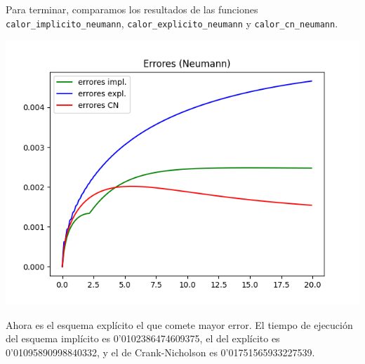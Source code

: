 \documentclass[a4paper, 12pt, oneside]{report}
\begin{document}
Para terminar, comparamos los resultados de las funciones \texttt{calor\_implicito\_neumann}, \texttt{calor\_explicito\_neumann} y \texttt{calor\_cn\_neumann}.
\begin{center}
    \includegraphics[scale = 0.8]{./images/Figure_4.png}
\end{center}
Ahora es el esquema explícito el que comete mayor error. El tiempo de ejecución del esquema implícito es 0'0102386474609375, el del explícito es 0'01095890998840332, y el de Crank-Nicholson es 0'01751565933227539.
\end{document}

